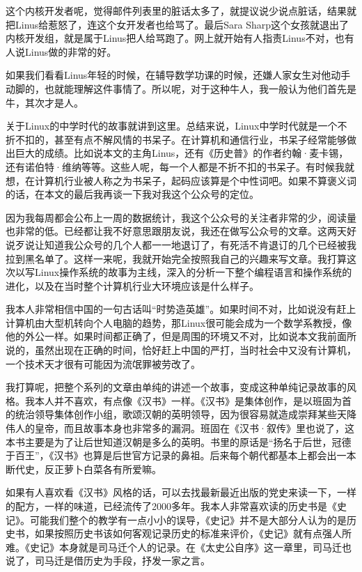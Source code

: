\documentclass[
  letterpaper,
  DIV=11,
  numbers=noendperiod]{scrreprt}
\begin{document}
这个内核开发者呢，觉得邮件列表里的脏话太多了，就提议说少说点脏话，结果就把Linus给惹怒了，连这个女开发者也给骂了。最后Sara
Sharp这个女孩就退出了内核开发组，就是属于Linus把人给骂跑了。网上就开始有人指责Linus不对，也有人说Linus做的非常的好。

如果我们看看Linus年轻的时候，在辅导数学功课的时候，还嫌人家女生对他动手动脚的，也就能理解这件事情了。所以呢，对于这种牛人，我一般认为他们首先是牛，其次才是人。

关于Linux的中学时代的故事就讲到这里。总结来说，Linux中学时代就是一个不折不扣的，甚至有点不解风情的书呆子。在计算机和通信行业，书呆子经常能够做出巨大的成绩。比如说本文的主角Linus，还有《历史普》的作者约翰·麦卡锡，还有诺伯特·维纳等等。这些人呢，每一个人都是不折不扣的书呆子。有时候我就想，在计算机行业被人称之为书呆子，起码应该算是个中性词吧。如果不算褒义词的话，在本文的最后我再谈一下我对我这个公众号的定位。

因为我每周都会公布上一周的数据统计，我这个公众号的关注者非常的少，阅读量也非常的低。已经都让我不好意思跟朋友说，我还在做写公众号的文章。这两天好说歹说让知道我公众号的几个人都一一地退订了，有死活不肯退订的几个已经被我拉到黑名单了。这样一来呢，我就开始完全按照我自己的兴趣来写文章。我打算这次以写Linux操作系统的故事为主线，深入的分析一下整个编程语言和操作系统的进化，以及在当时整个计算机行业大环境应该是什么样子。

我本人非常相信中国的一句古话叫``时势造英雄''。如果时间不对，比如说没有赶上计算机由大型机转向个人电脑的趋势，那Linux很可能会成为一个数学系教授，像他的外公一样。如果时间都正确了，但是周围的环境又不对，比如说本文我前面所说的，虽然出现在正确的时间，恰好赶上中国的严打，当时社会中又没有计算机，一个技术天才很有可能因为流氓罪被劳改了。

我打算呢，把整个系列的文章由单纯的讲述一个故事，变成这种单纯记录故事的风格。我本人并不喜欢，有点像《汉书》一样。《汉书》是集体创作，是以班固为首的统治领导集体创作小组，歌颂汉朝的英明领导，因为很容易就造成崇拜某些天降伟人的皇帝，而且故事本身也非常多的漏洞。班固在《汉书·叙传》里也说了，这本书主要是为了让后世知道汉朝是多么的英明。书里的原话是``扬名于后世，冠德于百王''，《汉书》也算是后世官方记录的鼻祖。后来每个朝代都基本上都会出一本断代史，反正萝卜白菜各有所爱嘛。

如果有人喜欢看《汉书》风格的话，可以去找最新最近出版的党史来读一下，一样的配方，一样的味道，已经流传了2000多年。我本人非常喜欢读的历史书是《史记》。可能我们整个的教学有一点小小的误导，《史记》并不是大部分人认为的是历史书，如果按照历史书该如何客观记录历史的标准来评价，《史记》就有点强人所难。《史记》本身就是司马迁个人的记录。在《太史公自序》这一章里，司马迁也说了，司马迁是借历史为手段，抒发一家之言。
\end{document}

